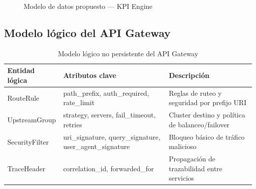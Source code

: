 \documentclass[12pt,a4paper]{article}
\begin{document}
\begin{figure}[H]
\centering
{}
\caption{Modelo de datos propuesto --- KPI Engine}
\end{figure}

\subsection{Modelo lógico del API Gateway}

\begin{table}[H]
\centering
\begin{tabularx}{\textwidth}{p{}Y Y}
\toprule
\textbf{Entidad lógica} & \textbf{Atributos clave} & \textbf{Descripción} \\
\midrule
RouteRule & path\_prefix, auth\_required, rate\_limit & Reglas de ruteo y seguridad por prefijo URI \\
UpstreamGroup & strategy, servers, fail\_timeout, retries & Cluster destino y política de balanceo/failover \\
SecurityFilter & uri\_signature, query\_signature, user\_agent\_signature & Bloqueo básico de tráfico malicioso \\
TraceHeader & correlation\_id, forwarded\_for & Propagación de trazabilidad entre servicios \\
\bottomrule
\end{tabularx}
\caption{Modelo lógico no persistente del API Gateway}
\end{table}
\end{document}
